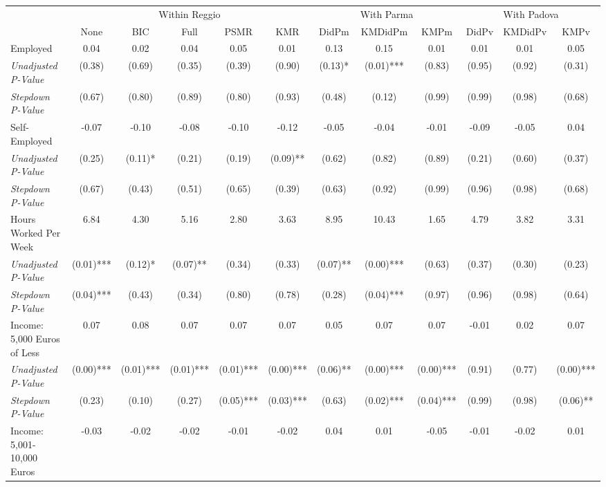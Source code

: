 \begin{tabular}{l c c c c c c c c c c c}
\toprule
& \multicolumn{5}{c}{Within Reggio} & \multicolumn{3}{c}{With Parma} & \multicolumn{3}{c}{With Padova} \\\cmidrule(lr){2-6} \cmidrule(lr){7-9} \cmidrule(lr){10-12}
 & None & BIC & Full & PSMR & KMR & DidPm & KMDidPm & KMPm & DidPv & KMDidPv & KMPv \\
\midrule
Employed & 0.04 & 0.02 & 0.04 & 0.05 & 0.01 & 0.13 & 0.15 & 0.01 & 0.01 & 0.01 & 0.05 \\
\quad \textit{Unadjusted P-Value} & (0.38) & (0.69) & (0.35) & (0.39) & (0.90) & (0.13)* & (0.01)*** & (0.83) & (0.95) & (0.92) & (0.31) \\
\quad \textit{Stepdown P-Value} & (0.67) & (0.80) & (0.89) & (0.80) & (0.93) & (0.48) & (0.12) & (0.99) & (0.99) & (0.98) & (0.68) \\
Self-Employed & -0.07 & -0.10 & -0.08 & -0.10 & -0.12 & -0.05 & -0.04 & -0.01 & -0.09 & -0.05 & 0.04 \\
\quad \textit{Unadjusted P-Value} & (0.25) & (0.11)* & (0.21) & (0.19) & (0.09)** & (0.62) & (0.82) & (0.89) & (0.21) & (0.60) & (0.37) \\
\quad \textit{Stepdown P-Value} & (0.67) & (0.43) & (0.51) & (0.65) & (0.39) & (0.63) & (0.92) & (0.99) & (0.96) & (0.98) & (0.68) \\
Hours Worked Per Week & 6.84 & 4.30 & 5.16 & 2.80 & 3.63 & 8.95 & 10.43 & 1.65 & 4.79 & 3.82 & 3.31 \\
\quad \textit{Unadjusted P-Value} & (0.01)*** & (0.12)* & (0.07)** & (0.34) & (0.33) & (0.07)** & (0.00)*** & (0.63) & (0.37) & (0.30) & (0.23) \\
\quad \textit{Stepdown P-Value} & (0.04)*** & (0.43) & (0.34) & (0.80) & (0.78) & (0.28) & (0.04)*** & (0.97) & (0.96) & (0.98) & (0.64) \\
Income: 5,000 Euros of Less & 0.07 & 0.08 & 0.07 & 0.07 & 0.07 & 0.05 & 0.07 & 0.07 & -0.01 & 0.02 & 0.07 \\
\quad \textit{Unadjusted P-Value} & (0.00)*** & (0.01)*** & (0.01)*** & (0.01)*** & (0.00)*** & (0.06)** & (0.00)*** & (0.00)*** & (0.91) & (0.77) & (0.00)*** \\
\quad \textit{Stepdown P-Value} & (0.23) & (0.10) & (0.27) & (0.05)*** & (0.03)*** & (0.63) & (0.02)*** & (0.04)*** & (0.99) & (0.98) & (0.06)** \\
Income: 5,001-10,000 Euros & -0.03 & -0.02 & -0.02 & -0.01 & -0.02 & 0.04 & 0.01 & -0.05 & -0.01 & -0.02 & 0.01 \\

\end{tabular}
